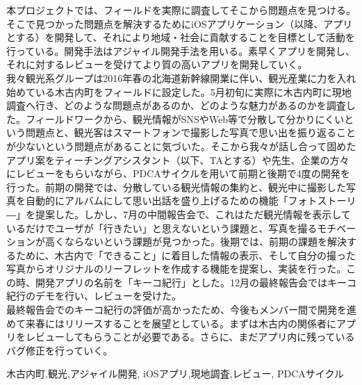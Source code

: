 \begin{jabstract}
\quad 本プロジェクトでは、フィールドを実際に調査してそこから問題点を見つける。そこで見つかった問題点を解決するためにiOSアプリケーション（以降、アプリとする）を開発して、それにより地域・社会に貢献することを目標として活動を行っている。開発手法はアジャイル開発手法を用いる。素早くアプリを開発し、それに対するレビューを受けてより質の高いアプリを開発していく。\\
\quad 我々観光系グループは2016年春の北海道新幹線開業に伴い、観光産業に力を入れ始めている木古内町をフィールドに設定した。5月初旬に実際に木古内町に現地調査へ行き、どのような問題点があるのか、どのような魅力があるのかを調査した。フィールドワークから、観光情報がSNSやWeb等で分散して分かりにくいという問題点と、観光客はスマートフォンで撮影した写真で思い出を振り返ることが少ないという問題点があることに気づいた。そこから我々が話し合って固めたアプリ案をティーチングアシスタント（以下、TAとする）や先生、企業の方々にレビューをもらいながら、PDCAサイクルを用いて前期と後期で4度の開発を行った。前期の開発では、分散している観光情報の集約と、観光中に撮影した写真を自動的にアルバムにして思い出話を盛り上げるための機能「フォトストーリ―」を提案した。しかし、7月の中間報告会で、これはただ観光情報を表示しているだけでユーザが「行きたい」と思えないという課題と、写真を撮るモチベーションが高くならないという課題が見つかった。後期では、前期の課題を解決するために、木古内で「できること」に着目した情報の表示、そして自分の撮った写真からオリジナルのリーフレットを作成する機能を提案し、実装を行った。この時、開発アプリの名前を「キーコ紀行」とした。12月の最終報告会ではキーコ紀行のデモを行い、レビューを受けた。\\
\quad 最終報告会でのキーコ紀行の評価が高かったため、今後もメンバー間で開発を進めて来春にはリリースすることを展望としている。まずは木古内の関係者にアプリをレビューしてもらうことが必要である。さらに、まだアプリ内に残っているバグ修正を行っていく。\\

\begin{jkeyword}
木古内町,観光,アジャイル開発, iOSアプリ,現地調査,レビュー, PDCAサイクル
\end{jkeyword}
\end{jabstract}

